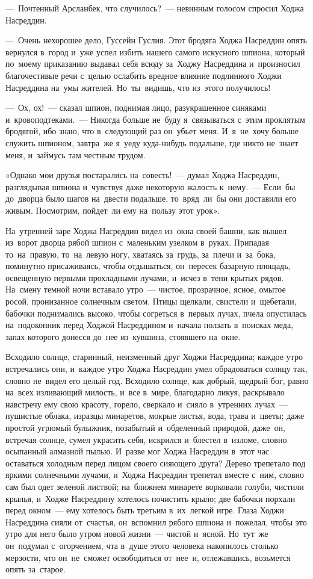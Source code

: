 \documentclass[12pt,a4paper]{book}
\begin{document}
—~Почтенный Арсланбек, что случилось?~— невинным голосом спросил Ходжа Насреддин.

—~Очень нехорошее дело, Гуссейн Гуслия. Этот бродяга Ходжа Насреддин опять вернулся в~город и~уже успел избить нашего самого искусного шпиона, который по~моему приказанию выдавал себя всюду за~Ходжу Насреддина и~произносил благочестивые речи с~целью ослабить вредное влияние подлинного Ходжи Насреддина на~умы жителей. Но~ты~видишь, что из~этого получилось!

—~Ох, ох!~— сказал шпион, поднимая лицо, разукрашенное синяками и~кровоподтеками.~— Никогда больше не~буду я~связываться с~этим проклятым бродягой, ибо знаю, что в~следующий раз он~убьет меня. И~я~не~хочу больше служить шпионом, завтра~же я~уеду куда-нибудь подальше, где никто не~знает меня, и~займусь там честным трудом.

«Однако мои друзья постарались на~совесть!~— думал Ходжа Насреддин, разглядывая шпиона и~чувствуя даже некоторую жалость к~нему.~— Если~бы до~дворца было шагов на~двести подальше, то~вряд~ли~бы они доставили его живым. Посмотрим, пойдет~ли ему на~пользу этот урок».

На~утренней заре Ходжа Насреддин видел из~окна своей башни, как вышел из~ворот дворца рябой шпион с~маленьким узелком в~руках. Припадая то~на~правую, то~на~левую ногу, хватаясь за~грудь, за~плечи и~за~бока, поминутно присаживаясь, чтобы отдышаться, он~пересек базарную площадь, освещенную первыми прохладными лучами, и~исчез в~тени крытых рядов. На~смену темной ночи вставало утро~— чистое, прозрачное, ясное, омытое росой, пронизанное солнечным светом. Птицы щелкали, свистели и~щебетали, бабочки поднимались высоко, чтобы согреться в~первых лучах, пчела опустилась на~подоконник перед Ходжой Насреддином и~начала ползать в~поисках меда, запах которого донесся до~нее из~кувшина, стоявшего на~окне.

Всходило солнце, старинный, неизменный друг Ходжи Насреддина; каждое утро встречались они, и~каждое утро Ходжа Насреддин умел обрадоваться солнцу так, словно не~видел его целый год. Всходило солнце, как добрый, щедрый бог, равно на~всех изливающий милость, и~все в~мире, благодарно ликуя, раскрывало навстречу ему свою красоту, горело, сверкало и~сияло в~утренних лучах~— пушистые облака, изразцы минаретов, мокрые листья, вода, трава и~цветы; даже простой угрюмый булыжник, позабытый и~обделенный природой, даже~он, встречая солнце, сумел украсить себя, искрился и~блестел в~изломе, словно осыпанный алмазной пылью. И~разве мог Ходжа Насреддин в~этот час оставаться холодным перед лицом своего сияющего друга? Дерево трепетало под яркими солнечными лучами, и~Ходжа Насреддин трепетал вместе с~ним, словно сам был одет зеленой листвой; на~ближнем минарете ворковали голуби, чистили крылья, и~Ходже Насреддину хотелось почистить крыло; две бабочки порхали перед окном~— ему хотелось быть третьим в~их~легкой игре. Глаза Ходжи Насреддина сияли от~счастья, он~вспомнил рябого шпиона и~пожелал, чтобы это утро для него было утром новой жизни~— чистой и~ясной. Но~тут~же он~подумал с~огорчением, чта в~душе этого человека накопилось столько мерзости, что он~не~сможет освободиться от~нее~и, отлежавшись, возьмется опять за~старое.
\end{document}
